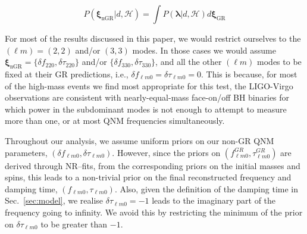 \documentclass[twocolumn,prd,superscriptaddress,amsfonts,amssymb,amsmath,preprintnumbers]{revtex4-1}
\newcommand{\abhi}[1]{\textcolor{red}{[\textit{AG: #1}]}}
\newcommand{\blambda}{\bm{\lambda}}
\newcommand{\bxigr}{\bm{\xi}_{\text{GR}}}
\newcommand{\bxingr}{\bm{\xi}_{\text{nGR}}}
\newcommand{\df}[1]{\delta f_{\text{#1}}}
\newcommand{\dtau}[1]{\delta \tau_{\text{#1}}}
\begin{document}
\begin{equation}
P(\bxingr | d, \mathcal{H})= \int P(\blambda | d, \mathcal{H}) d\bxigr
\end{equation}

For most of the results discussed in this paper, we would restrict ourselves to the $(\ell m) = (2,2)$ and/or $(3,3)$ modes. In those cases we would assume $\bxingr = \{\df{220},\dtau{220}\}$ and/or  $ \{\df{330},\dtau{330}\}$, and all the other $(\ell m)$ modes to be fixed at their GR predictions, i.e., $\delta f_{\ell m 0} = \delta \tau_{\ell m 0} = 0$. This is because, for most of the high-mass events we find most appropriate for this test, the LIGO-Virgo observations are consistent with nearly-equal-mass face-on/off BH binaries for which power in the subdominant modes is not enough to attempt to measure more than one, or at most QNM frequencies simultaneously. 

Throughout our analysis, we assume uniform priors on our non-GR QNM parameters, $(\delta f_{\ell m 0},\delta \tau_{\ell m 0})$. However, since the priors on $( f_{\ell m 0}^{GR},\tau_{\ell m 0}^{GR})$ are derived through NR--fits, from the corresponding priors on the initial masses and spins, this leads to a non-trivial prior on the final reconstructed frequency and damping time, $( f_{\ell m 0},\tau_{\ell m 0})$. Also, given the definition of the damping time in Sec.~\ref{sec:model}, we realise $\delta \tau_{\ell m 0} = -1$ leads to the imaginary part of the frequency going to infinity. We avoid this by restricting the minimum of the prior on $\delta \tau_{\ell m 0}$ to be greater than $-1$.

\end{document}
